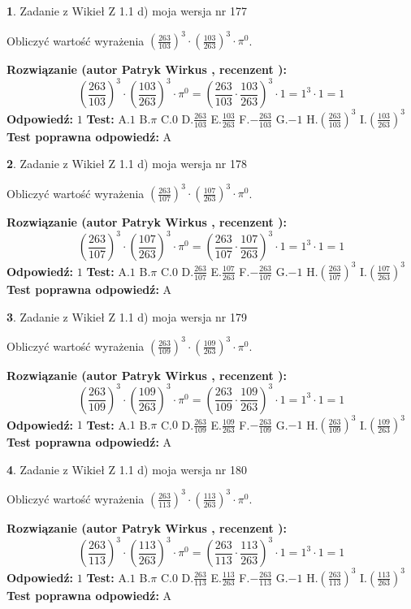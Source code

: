 \documentclass[12pt, a4paper]{article}
\theoremstyle{definition} %
\newtheorem{zad}{}
\newcommand{\zadStart}[1]{\begin{zad}#1\newline}
\newcommand{\zadStop}{\end{zad}}
\newcommand{\rozwStart}[2]{\noindent \textbf{Rozwiązanie (autor #1 , recenzent #2): }\newline}
\newcommand{\rozwStop}{\newline}
\newcommand{\odpStart}{\noindent \textbf{Odpowiedź:}\newline}
\newcommand{\odpStop}{\newline}
\newcommand{\testStart}{\noindent \textbf{Test:}\newline}
\newcommand{\testStop}{\newline}
\newcommand{\kluczStart}{\noindent \textbf{Test poprawna odpowiedź:}\newline}
\newcommand{\kluczStop}{\newline}
\begin{document}
\zadStart{Zadanie z Wikieł Z 1.1 d) moja wersja nr 177}

Obliczyć wartość wyrażenia $(\frac{263}{103})^{3} \cdot (\frac{103}{263})^{3} \cdot \pi^{0}$.
\zadStop
\rozwStart{Patryk Wirkus}{}
$$(\frac{263}{103})^{3} \cdot (\frac{103}{263})^{3} \cdot \pi^{0} = (\frac{263}{103} \cdot \frac{103}{263})^{3} \cdot 1 = 1^{3} \cdot 1 = 1$$
\rozwStop
\odpStart
$1$
\odpStop
\testStart
A.$1$ B.$\pi$ C.$0$ D.$\frac{263}{103}$ E.$\frac{103}{263}$
F.$-\frac{263}{103}$ G.$-1$
H.$(\frac{263}{103})^{3}$
I.$(\frac{103}{263})^{3}$
\testStop
\kluczStart
A
\kluczStop



\zadStart{Zadanie z Wikieł Z 1.1 d) moja wersja nr 178}

Obliczyć wartość wyrażenia $(\frac{263}{107})^{3} \cdot (\frac{107}{263})^{3} \cdot \pi^{0}$.
\zadStop
\rozwStart{Patryk Wirkus}{}
$$(\frac{263}{107})^{3} \cdot (\frac{107}{263})^{3} \cdot \pi^{0} = (\frac{263}{107} \cdot \frac{107}{263})^{3} \cdot 1 = 1^{3} \cdot 1 = 1$$
\rozwStop
\odpStart
$1$
\odpStop
\testStart
A.$1$ B.$\pi$ C.$0$ D.$\frac{263}{107}$ E.$\frac{107}{263}$
F.$-\frac{263}{107}$ G.$-1$
H.$(\frac{263}{107})^{3}$
I.$(\frac{107}{263})^{3}$
\testStop
\kluczStart
A
\kluczStop



\zadStart{Zadanie z Wikieł Z 1.1 d) moja wersja nr 179}

Obliczyć wartość wyrażenia $(\frac{263}{109})^{3} \cdot (\frac{109}{263})^{3} \cdot \pi^{0}$.
\zadStop
\rozwStart{Patryk Wirkus}{}
$$(\frac{263}{109})^{3} \cdot (\frac{109}{263})^{3} \cdot \pi^{0} = (\frac{263}{109} \cdot \frac{109}{263})^{3} \cdot 1 = 1^{3} \cdot 1 = 1$$
\rozwStop
\odpStart
$1$
\odpStop
\testStart
A.$1$ B.$\pi$ C.$0$ D.$\frac{263}{109}$ E.$\frac{109}{263}$
F.$-\frac{263}{109}$ G.$-1$
H.$(\frac{263}{109})^{3}$
I.$(\frac{109}{263})^{3}$
\testStop
\kluczStart
A
\kluczStop



\zadStart{Zadanie z Wikieł Z 1.1 d) moja wersja nr 180}

Obliczyć wartość wyrażenia $(\frac{263}{113})^{3} \cdot (\frac{113}{263})^{3} \cdot \pi^{0}$.
\zadStop
\rozwStart{Patryk Wirkus}{}
$$(\frac{263}{113})^{3} \cdot (\frac{113}{263})^{3} \cdot \pi^{0} = (\frac{263}{113} \cdot \frac{113}{263})^{3} \cdot 1 = 1^{3} \cdot 1 = 1$$
\rozwStop
\odpStart
$1$
\odpStop
\testStart
A.$1$ B.$\pi$ C.$0$ D.$\frac{263}{113}$ E.$\frac{113}{263}$
F.$-\frac{263}{113}$ G.$-1$
H.$(\frac{263}{113})^{3}$
I.$(\frac{113}{263})^{3}$
\testStop
\kluczStart
A
\kluczStop
\end{document}
